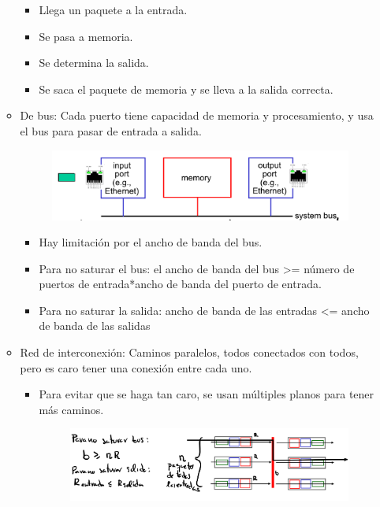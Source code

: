 \documentclass[12pt, twoside, openright]{report} %
\begin{document}
\begin{itemize}
\begin{itemize}
		            \begin{itemize}
			            \item Llega un paquete a la entrada.
			            \item Se pasa a memoria.
			            \item Se determina la salida.
			            \item Se saca el paquete de memoria y se lleva a la salida correcta.
		            \end{itemize}
		      \item De bus: Cada puerto tiene capacidad de memoria y procesamiento,
		            y usa el bus para pasar de entrada a salida.
		            \begin{figure}[H]
			            {\includegraphics[scale=.15]{Untitled 24.png}}
		            \end{figure}
		            \begin{itemize}
			            \item Hay limitación por el ancho de banda del bus.
			            \item Para no saturar el bus: el ancho de banda del bus
			                  \textgreater= número de puertos de entrada*ancho de banda del
			                  puerto de entrada.
			            \item Para no saturar la salida: ancho de banda de las entradas
			                  \textless= ancho de banda de las salidas
		            \end{itemize}
		      \item Red de interconexión: Caminos paralelos, todos conectados con
		            todos, pero es caro tener una conexión entre cada uno.

		            \begin{itemize}
			            \item Para evitar que se haga tan caro, se usan múltiples planos
			                  para tener más caminos.
			                  \begin{figure}[H]
				                  {\includegraphics[scale=.2]{Untitled 25.png}}
			                  \end{figure}
		            \end{itemize}



\end{itemize}
\end{itemize}
\end{document}
